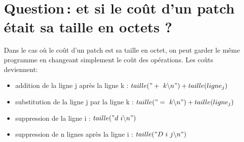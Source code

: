 \documentclass[a4paper, 10pt, french]{article}
\begin{document}
\section{Question\,: et  si le coût d'un patch était sa taille en octets ?}
    Dans le cas où le coût d'un patch est sa taille en octet,
on peut garder le même programme en changeant simplement le coût des opérations.
Les coûts deviennent:

\begin{itemize}
\item addition de la ligne j après la ligne k : $taille("+\ k\backslash n") + taille(ligne_j)$
\item substitution de la ligne j par la ligne k : $taille("=\ k\backslash n") + taille(ligne_j)$
\item suppression de la ligne i : $taille("d\ i\backslash n")$
\item suppression de n lignes après la ligne i : $taille("D\ i\ j\backslash n")$
\end{itemize}

\end{document}
